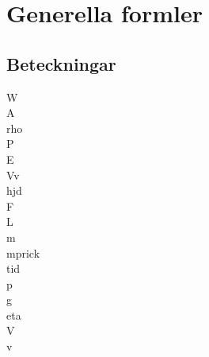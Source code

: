 \chapter{Generella formler}
\section*{Beteckningar}

\acrfull{W}\\
\acrfull{A}\\
\acrfull{rho}\\
\acrfull{P}\\
\acrfull{E}\\
\acrfull{Vv}\\
\acrfull{hjd}\\
\acrfull{F}\\
\acrfull{L}\\
\acrfull{m}\\
\acrfull{mprick}\\
\acrfull{tid}\\
\acrfull{p}\\
\acrfull{g}\\
\acrfull{eta}\\
\acrfull{V}\\
\acrfull{v}

